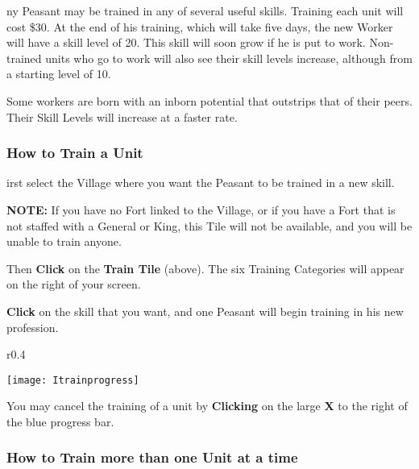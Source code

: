 
ny Peasant may be trained in any of several useful skills. Training each unit will cost \$30. At the end of his training, which will take five days, the new Worker will have a skill level of 20. This skill will soon grow if he is put to work. Non-trained units who go to work will also see their skill levels increase, although from a starting level of 10.

Some workers are born with an inborn potential that outstrips that of their peers. Their Skill Levels will increase at a faster rate.

\subsubsection{\textsf{How to Train a Unit}}

irst select the Village where you want the Peasant to be trained in a new skill.


\textbf{NOTE:} If you have no Fort linked to the Village, or if you have a Fort that is not staffed with a General or King, this Tile will not be available, and you will be unable to train anyone.

Then \textbf{Click} on the \textbf{Train Tile} (above). The six Training Categories will appear on the right of your screen.

\textbf{Click} on the skill that you want, and one Peasant will begin training in his new profession.

\begin{wrapfigure}{r}{0.4\textwidth}
    \vspace{-20pt}
    \begin{center}
        \texttt{[image: Itrainprogress]} %
    \end{center}
    \vspace{-15pt}
\end{wrapfigure}


You may cancel the training of a unit by \textbf{Clicking} on the large \textbf{X} to the right of the blue progress bar.

\subsubsection{\textsf{How to Train more than one Unit at a time}}


